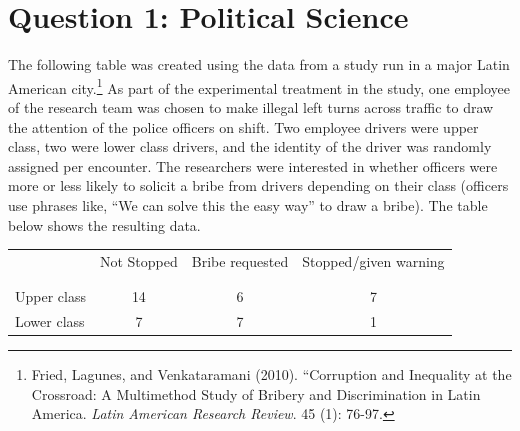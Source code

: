 \documentclass[12pt,letterpaper]{article}
\begin{document}
\pagebreak	
	\section*{Question 1: Political Science}
		\vspace{.25cm}
	The following table was created using the data from a study run in a major Latin American city.\footnote{Fried, Lagunes, and Venkataramani (2010). ``Corruption and Inequality at the Crossroad: A Multimethod Study of Bribery and Discrimination in Latin America. \textit{Latin American Research Review}. 45 (1): 76-97.} As part of the experimental treatment in the study, one employee of the research team was chosen to make illegal left turns across traffic to draw the attention of the police officers on shift. Two employee drivers were upper class, two were lower class drivers, and the identity of the driver was randomly assigned per encounter. The researchers were interested in whether officers were more or less likely to solicit a bribe from drivers depending on their class (officers use phrases like, ``We can solve this the easy way'' to draw a bribe). The table below shows the resulting data.

\begin{table}[h!]
	\centering
	\begin{tabular}{l | c c c }
		& Not Stopped & Bribe requested & Stopped/given warning \\
		\\[-1.8ex] 
		\hline \\[-1.8ex]
		Upper class & 14 & 6 & 7 \\
		Lower class & 7 & 7 & 1 \\
		\hline
	\end{tabular}
\end{table}
\end{document}
